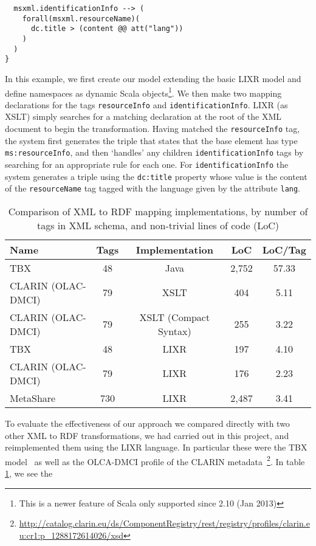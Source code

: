 \documentclass{llncs}
\begin{document}
{{\begin{verbatim}
  msxml.identificationInfo --> (
    forall(msxml.resourceName)(
      dc.title > (content @@ att("lang"))
    )
  )
}
\end{verbatim}}
In this example, we first create our model extending the basic LIXR model and
define namespaces as dynamic Scala objects\footnote{This is a newer feature of
Scala only supported since 2.10 (Jan 2013)}. We then make two mapping
declarations for the tags {\tt resourceInfo} and {\tt identificationInfo}. LIXR (as
XSLT) simply searches for a matching declaration at the root of the XML document
to begin the transformation. Having matched the {\tt resourceInfo} tag, the system
first generates the triple that states that the base element has type
{\tt ms:resourceInfo}, and then `handles' any children {\tt identificationInfo} tags by
searching for an appropriate rule for each one. For {\tt identificationInfo} the
system generates a triple using the {\tt dc:title} property whose value is the
content of the {\tt resourceName} tag tagged with the language given by the
attribute {\tt lang}.
\begin{table}
\begin{center}
\begin{tabular}{p{4cm}|cccc}
Name & Tags & Implementation & LoC & LoC/Tag \\
\hline
TBX & 48 & Java & 2,752 & 57.33 \\
CLARIN (OLAC-DMCI) & 79 & XSLT & 404 & 5.11 \\
CLARIN (OLAC-DMCI) & 79 & XSLT (Compact Syntax) & 255 & 3.22 \\
\hline
TBX & 48 & LIXR & 197 & 4.10 \\
CLARIN (OLAC-DMCI) & 79 & LIXR & 176 & 2.23 \\
MetaShare & 730 & LIXR & 2,487 & 3.41 \\
\end{tabular}
\end{center}
\caption{\label{tab:locs}Comparison of XML to RDF mapping implementations,
by number of tags in XML schema, and non-trivial lines of code (LoC)}
\end{table}
To evaluate the effectiveness of our approach we compared directly with two other
XML to RDF transformations, we had carried out in this project, and
reimplemented them using the LIXR language. In particular these were the TBX
model~\cite{iso30042} as well as the OLCA-DMCI profile of the CLARIN
metadata~\footnote{\url{http://catalog.clarin.eu/ds/ComponentRegistry/rest/registry/profiles/clarin.eu:cr1:p\_1288172614026/xsd}}. In table \ref{tab:locs}, we see the
}
\end{document}
